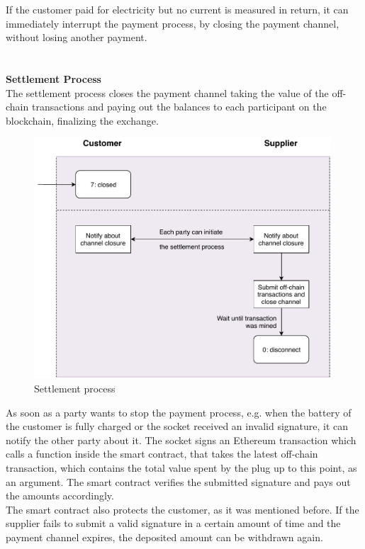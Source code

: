 If the customer paid for electricity but no current is measured in return, it can immediately interrupt the payment process, by closing the payment channel, without losing another payment.
\\\\\\
\textbf{Settlement Process}\\
The settlement process closes the payment channel taking the value of the off-chain transactions and paying out the balances to each participant on the blockchain, finalizing the exchange.
\begin{figure}[H]
  \begin{center}
    \includegraphics[height=9cm]{img/Plug-Socket-settlement_process.pdf}
    \caption{Settlement process}
    \label{fig:settlement_process}
  \end{center}
\end{figure}
As soon as a party wants to stop the payment process, e.g. when the battery of the customer is fully charged or the socket received an invalid signature, it can notify the other party about it.
The socket signs an Ethereum transaction which calls a function inside the smart contract, that takes the latest off-chain transaction, which contains the total value spent by the plug up to this point, as an argument.
The smart contract verifies the submitted signature and pays out the amounts accordingly.
\\
The smart contract also protects the customer, as it was mentioned before.
If the supplier fails to submit a valid signature in a certain amount of time and the payment channel expires, the deposited amount can be withdrawn again.
\\
